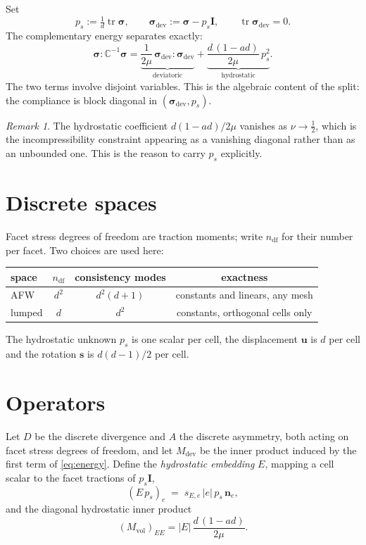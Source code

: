 \documentclass[11pt,a4paper]{article}
\newcommand{\dev}{\mathrm{dev}}
\newcommand{\tr}{\operatorname{tr}}
\newcommand{\bsig}{\boldsymbol{\sigma}}
\newcommand{\bu}{\boldsymbol{u}}
\newcommand{\bn}{\boldsymbol{n}}
\newcommand{\bI}{\boldsymbol{I}}
\newcommand{\bC}{\mathbb{C}}
\theoremstyle{plain}
\theoremstyle{remark}
\newtheorem{remark}{Remark}
\begin{document}
Set
\begin{equation}
  p_s := \tfrac{1}{d}\tr\bsig,
  \qquad
  \bsig_{\dev} := \bsig - p_s\bI ,
  \qquad \tr\bsig_{\dev}=0 .
  \label{eq:split}
\end{equation}
The complementary energy separates exactly:
\begin{equation}
  \bsig : \bC^{-1}\bsig
  = \underbrace{\frac{1}{2\mu}\,\bsig_{\dev}\!:\!\bsig_{\dev}}_{\text{deviatoric}}
  + \underbrace{\frac{d\,(1-ad)}{2\mu}\,p_s^{2}}_{\text{hydrostatic}} .
  \label{eq:energy}
\end{equation}
The two terms involve disjoint variables. This is the algebraic content of the
split: the compliance is block diagonal in $(\bsig_{\dev},p_s)$.

\begin{remark}
The hydrostatic coefficient $d(1-ad)/2\mu$ vanishes as $\nu\to\tfrac12$, which
is the incompressibility constraint appearing as a vanishing diagonal rather
than as an unbounded one. This is the reason to carry $p_s$ explicitly.
\end{remark}

\section{Discrete spaces}

Facet stress degrees of freedom are traction moments; write $n_{\mathrm{df}}$
for their number per facet. Two choices are used here:
\begin{center}
\begin{tabular}{lccc}
\toprule
space & $n_{\mathrm{df}}$ & consistency modes & exactness \\
\midrule
AFW    & $d^{2}$ & $d^{2}(d+1)$ & constants and linears, any mesh \\
lumped & $d$     & $d^{2}$      & constants, orthogonal cells only \\
\bottomrule
\end{tabular}
\end{center}
The hydrostatic unknown $p_s$ is one scalar per cell, the displacement $\bu$ is
$d$ per cell and the rotation $\boldsymbol{s}$ is $d(d-1)/2$ per cell.

\section{Operators}

Let $D$ be the discrete divergence and $A$ the discrete asymmetry, both acting
on facet stress degrees of freedom, and let $M_{\dev}$ be the inner product
induced by the first term of \eqref{eq:energy}. Define the \emph{hydrostatic
embedding} $E$, mapping a cell scalar to the facet tractions of $p_s\bI$,
\begin{equation}
  (E\,p_s)_{e} \;=\; s_{E,e}\,|e|\,p_s\,\bn_e ,
  \label{eq:embedding}
\end{equation}
and the diagonal hydrostatic inner product
\begin{equation}
  (M_{\mathrm{vol}})_{EE} = |E|\,\frac{d\,(1-ad)}{2\mu} .
  \label{eq:mvol}
\end{equation}
\end{document}
